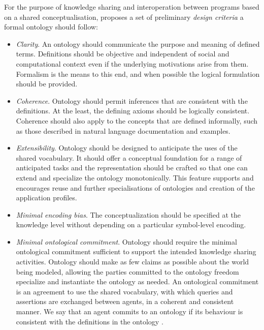 	For the purpose of knowledge sharing and interoperation between programs based on a shared conceptualisation, \citet{gruber1995} proposes a set of preliminary \textit{design criteria} a formal ontology should follow:
	
	\begin{itemize}
		\item \textit{Clarity}. An ontology should communicate the purpose and meaning of defined terms. Definitions should be objective and independent of social and computational context even if the underlying motivations arise from them. Formalism is the means to this end, and when possible the logical formulation should be provided. 
		\item \textit{Coherence}. Ontology should permit inferences that are consistent with the definitions. At the least, the defining axioms should be logically consistent. Coherence should also apply to the concepts that are defined informally, such as those described in natural language documentation and examples.
		\item \textit{Extensibility}. Ontology should be designed to anticipate the uses of the shared vocabulary. It should offer a conceptual foundation for a range of anticipated tasks and the representation should be crafted so that one can extend and specialize the ontology monotonically. This feature supports and encourages reuse and further specialisations of ontologies and creation of the application profiles. 
		\item \textit{Minimal encoding bias}. The conceptualization should be specified at the knowledge level without depending on a particular symbol-level encoding. 
		\item \textit{Minimal ontological commitment}. Ontology should require the minimal ontological commitment sufficient to support the intended knowledge sharing activities. Ontology should make as few claims as possible about the world being modeled, allowing the parties committed to the ontology freedom specialize and instantiate the ontology as needed. An ontological commitment is an agreement to use the shared vocabulary, with which queries and assertions are exchanged between agents, in a coherent and consistent manner. We say that an agent commits to an ontology if its behaviour is consistent with the definitions in the ontology \cite{gruber1995}.		
	\end{itemize}	